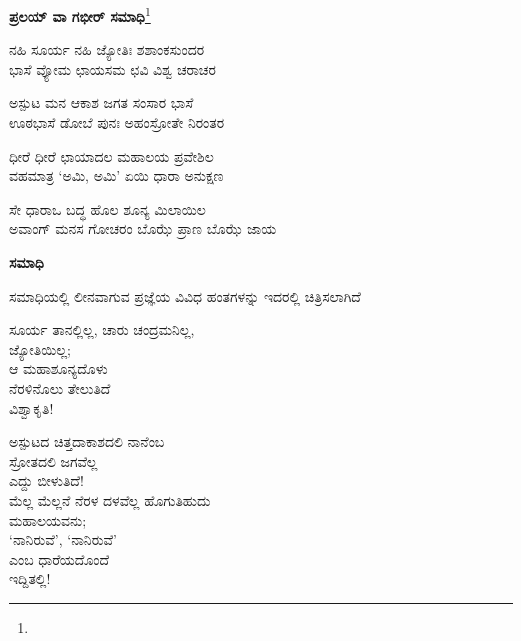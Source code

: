 \begin{center}
\textbf{ಪ್ರಲಯ್ ವಾ ಗಭೀರ್ ಸಮಾಧಿ}\footnote{}
\end{center}

\begin{myquote}
ನಹಿ ಸೂರ್ಯ ನಹಿ ಜ್ಯೋತಿಃ ಶಶಾಂಕಸುಂದರ\\ಭಾಸೆ ವ್ಯೋಮ ಛಾಯಸಮ ಛವಿ ವಿಶ್ವ ಚರಾಚರ
\end{myquote}


\begin{myquote}
ಅಸ್ಪುಟ ಮನ ಆಕಾಶ ಜಗತ ಸಂಸಾರ ಭಾಸೆ\\ಊಠಭಾಸೆ ಡೋಬೆ ಪುನಃ ಅಹಂಸ್ರೋತೇ ನಿರಂತರ
\end{myquote}


\begin{myquote}
ಧೀರೆ ಧೀರೆ ಛಾಯಾದಲ ಮಹಾಲಯ ಪ್ರವೇಶಿಲ\\ವಹಮಾತ್ರ ‘ಅಮಿ, ಅಮಿ’ ಏಯಿ ಧಾರಾ ಅನುಕ್ಷಣ
\end{myquote}


\begin{myquote}
ಸೇ ಧಾರಾಒ ಬದ್ಧ ಹೊಲ ಶೂನ್ಯ ಮಿಲಾಯಿಲ\\ಅವಾಂಗ್ ಮನಸ ಗೋಚರಂ ಬೊಝೆ ಪ್ರಾಣ ಬೊಝೆ ಜಾಯ
\end{myquote}


\begin{center}
\textbf{ಸಮಾಧಿ}
\end{center}

ಸಮಾಧಿಯಲ್ಲಿ ಲೀನವಾಗುವ ಪ್ರಜ್ಞೆಯ ವಿವಿಧ ಹಂತಗಳನ್ನು ಇದರಲ್ಲಿ ಚಿತ್ರಿಸಲಾಗಿದೆ

\begin{myquote}
ಸೂರ್ಯ ತಾನಲ್ಲಿಲ್ಲ, ಚಾರು ಚಂದ್ರಮನಿಲ್ಲ,\\ಜ್ಯೋತಿಯಿಲ್ಲ;\\ಆ ಮಹಾಶೂನ್ಯದೊಳು\\ನೆರಳಿನೊಲು ತೇಲುತಿದೆ\\ವಿಶ್ವಾಕೃತಿ!
\end{myquote}

\begin{myquote}
ಅಸ್ಪುಟದ ಚಿತ್ತದಾಕಾಶದಲಿ ನಾನೆಂಬ\\ಸ್ರೋತದಲಿ ಜಗವೆಲ್ಲ\\ಎದ್ದು ಬೀಳುತಿದೆ!\\ಮೆಲ್ಲ ಮೆಲ್ಲನೆ ನೆರಳ ದಳವೆಲ್ಲ ಹೊಗುತಿಹುದು\\ಮಹಾಲಯವನು;\\‘ನಾನಿರುವೆ’, ‘ನಾನಿರುವೆ’\\ಎಂಬ ಧಾರೆಯದೊಂದೆ\\ಇದ್ದಿತಲ್ಲಿ!
\end{myquote}

